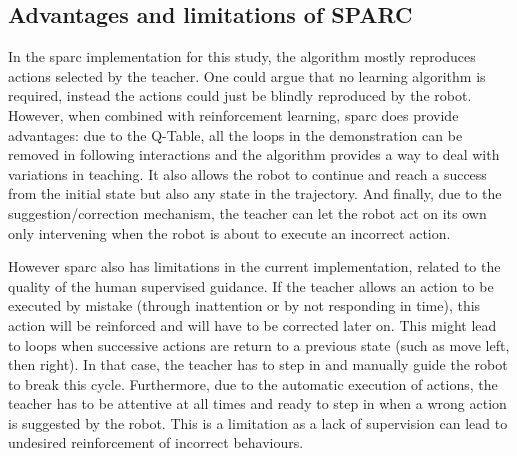 \subsection{Advantages and limitations of SPARC}

In the \gls{sparc} implementation for this study, the algorithm mostly reproduces actions selected by the teacher. One could argue that no learning algorithm is required, instead the actions could just be blindly reproduced by the robot. However, when combined with reinforcement learning, \gls{sparc} does provide advantages: due to the Q-Table, all the loops in the demonstration can be removed in following interactions and the algorithm provides a way to deal with variations in teaching. It also allows the robot to continue and reach a success from the initial state but also any state in the trajectory. And finally, due to the suggestion/correction mechanism, the teacher can let the robot act on its own only intervening when the robot is about to execute an incorrect action. 


However \gls{sparc} also has limitations in the current implementation, related to the quality of the human supervised guidance. If the teacher allows an action to be executed by mistake (through inattention or by not responding in time), this action will be reinforced and will have to be corrected later on. This might lead to loops when successive actions are return to a previous state (such as move left, then right). In that case, the teacher has to step in and manually guide the robot to break this cycle. Furthermore, due to the automatic execution of actions, the teacher has to be attentive at all times and ready to step in when a wrong action is suggested by the robot. This is a limitation as a lack of supervision can lead to undesired reinforcement of incorrect behaviours.

